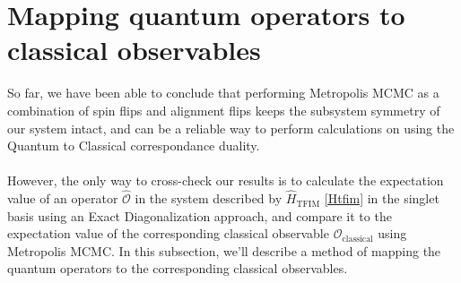 \documentclass[../thesis_main.tex]{subfiles}
\begin{document}
\section{Mapping quantum operators to classical observables}
So far, we have been able to conclude that performing Metropolis MCMC as a combination of spin flips and alignment flips keeps the subsystem symmetry of our system intact, and can be a reliable way to perform calculations on using the Quantum to Classical correspondance duality.~\\~\\ 
However, the only way to cross-check our results is to calculate the expectation value of an operator $\hat{\mathcal{O}}$ in the system described by $\hat{H}_\text{TFIM}$ \eqref{Htfim} in the singlet basis using an Exact Diagonalization approach, and compare it to the expectation value of the corresponding classical observable $\mathcal{O}_\text{classical}$ using Metropolis MCMC. In this subsection, we'll describe a method of mapping the quantum operators to the corresponding classical observables.
\end{document}

